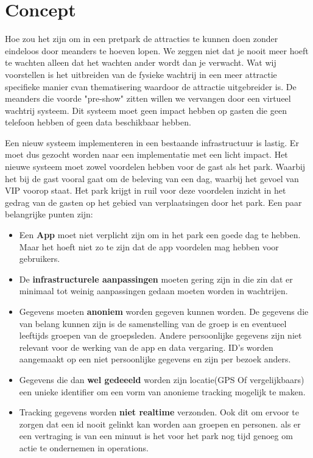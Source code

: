 \chapter{Concept}\label{ch:concept}
Hoe zou het zijn om in een pretpark de attracties te kunnen doen zonder eindeloos door meanders te hoeven lopen.
We zeggen niet dat je nooit meer hoeft te wachten alleen dat het wachten ander wordt dan je verwacht.
Wat wij voorstellen is het uitbreiden van de fysieke wachtrij in een meer attractie specifieke manier cvan thematisering waardoor de attractie uitgebreider is. De meanders die voorde "pre-show" zitten willen we vervangen door een virtueel wachtrij systeem. Dit systeem moet geen impact hebben op gasten die geen telefoon hebben of geen data beschikbaar hebben.






Een nieuw systeem implementeren in een bestaande infrastructuur is lastig.
Er moet dus gezocht worden naar een implementatie met een licht impact.
Het nieuwe systeem moet zowel voordelen hebben voor de gast als het park.
Waarbij het bij de gast vooral gaat om de beleving van een dag, waarbij het gevoel van VIP voorop staat.
Het park krijgt in ruil voor deze voordelen inzicht in het gedrag van de gasten op het gebied van verplaatsingen door het park.
Een paar belangrijke punten zijn:
\begin{itemize}
    \item Een \textbf{App} moet niet verplicht zijn om in het park een goede dag te hebben.
    Maar het hoeft niet zo te zijn dat de app voordelen mag hebben voor gebruikers.
    \item De \textbf{infrastructurele aanpassingen} moeten gering zijn in die zin dat er minimaal tot weinig aanpassingen gedaan moeten worden in wachtrijen.
    \item Gegevens moeten \textbf{anoniem} worden gegeven kunnen worden. De gegevens die van belang kunnen zijn is de samenstelling van de groep is en eventueel leeftijds groepen van de groepsleden. Andere persoonlijke gegevens zijn niet relevant voor de werking van de app en data vergaring. ID's worden aangemaakt op een niet persoonlijke gegevens en zijn per bezoek anders.
    \item Gegevens die dan \textbf{wel gedeeeld} worden zijn locatie(GPS Of vergelijkbaars) een unieke identifier om een vorm van anonieme tracking mogelijk te maken.
    \item Tracking gegevens worden \textbf{niet realtime} verzonden. Ook dit om ervoor te zorgen dat een id nooit gelinkt kan worden aan groepen en personen. als er een vertraging is van een minuut is het voor het park nog tijd genoeg om actie te ondernemen in operations.
\end{itemize}


